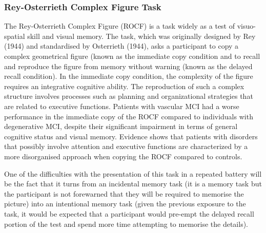 \documentclass{article}
\begin{document}
\subsubsection{Rey-Osterrieth Complex Figure Task}
The Rey-Osterrieth Complex Figure (ROCF) is a task widely as a test of visuo-spatial skill and visual memory. The task, which was originally designed by Rey (1944) and standardised by Osterrieth (1944), asks a participant to copy a complex geometrical figure (known as the immediate copy condition and to recall and reproduce the figure from memory without warning (known as the delayed recall condition). In the immediate copy condition, the complexity of the figure requires an integrative cognitive ability. The reproduction of such a complex structure involves processes such as planning and organizational strategies that are related to executive functions.
Patients with vascular MCI had a worse performance in the immediate copy of the ROCF compared to individuals with degenerative MCI, despite their significant impairment in terms of general cognitive status and visual memory. Evidence shows that patients with disorders that possibly involve attention and executive functions are characterized by a more disorganised approach when copying the ROCF compared to controls.

One of the difficulties with the presentation of this task in a repeated battery will be the fact that it turns from an incidental memory task (it is a memory task but the participant is not forewarned that they will be required to memorise the picture) into an intentional memory task (given the previous exposure to the task, it would be expected that a participant would pre-empt the delayed recall portion of the test and spend more time attempting to memorise the details). 
\end{document}
